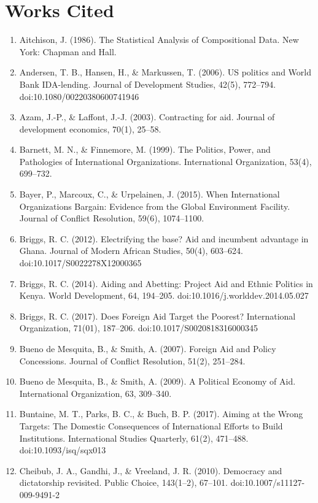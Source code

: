 \documentclass{article}
\begin{document}
\section*{Works Cited}
\begin{singlespace}
\begin{enumerate}
 

	\item Aitchison, J. (1986). The Statistical Analysis of Compositional Data. New York: Chapman and Hall.
	\item Andersen, T. B., Hansen, H., \& Markussen, T. (2006). US politics and World Bank IDA-lending. Journal of Development Studies, 42(5), 772–794. doi:10.1080/00220380600741946
	\item Azam, J.-P., \& Laffont, J.-J. (2003). Contracting for aid. Journal of development economics, 70(1), 25–58.
	\item Barnett, M. N., \& Finnemore, M. (1999). The Politics, Power, and Pathologies of International Organizations. International Organization, 53(4), 699–732.
	\item Bayer, P., Marcoux, C., \& Urpelainen, J. (2015). When International Organizations Bargain: Evidence from the Global Environment Facility. Journal of Conflict Resolution, 59(6), 1074–1100.
	\item Briggs, R. C. (2012). Electrifying the base? Aid and incumbent advantage in Ghana. Journal of Modern African Studies, 50(4), 603–624. doi:10.1017/S0022278X12000365
	\item Briggs, R. C. (2014). Aiding and Abetting: Project Aid and Ethnic Politics in Kenya. World Development, 64, 194–205. doi:10.1016/j.worlddev.2014.05.027
	\item Briggs, R. C. (2017). Does Foreign Aid Target the Poorest? International Organization, 71(01), 187–206. doi:10.1017/S0020818316000345
	\item Bueno de Mesquita, B., \& Smith, A. (2007). Foreign Aid and Policy Concessions. Journal of Conflict Resolution, 51(2), 251–284.
	\item Bueno de Mesquita, B., \& Smith, A. (2009). A Political Economy of Aid. International Organization, 63, 309–340.
	\item Buntaine, M. T., Parks, B. C., \& Buch, B. P. (2017). Aiming at the Wrong Targets: The Domestic Consequences of International Efforts to Build Institutions. International Studies Quarterly, 61(2), 471–488. doi:10.1093/isq/sqx013
	\item Cheibub, J. A., Gandhi, J., \& Vreeland, J. R. (2010). Democracy and dictatorship revisited. Public Choice, 143(1–2), 67–101. doi:10.1007/s11127-009-9491-2

\end{enumerate}
\end{singlespace}
\end{document}
